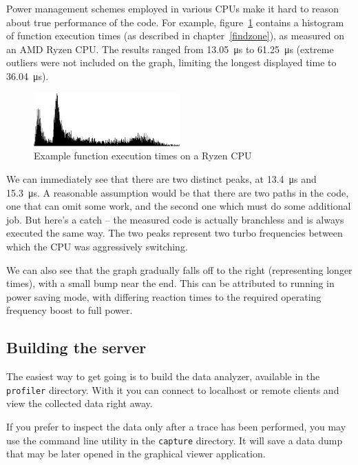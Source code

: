 \documentclass[hidelinks,titlepage,a4paper]{article}
\begin{document}
Power management schemes employed in various CPUs make it hard to reason about true performance of the code. For example, figure~\ref{ryzenimage} contains a histogram of function execution times (as described in chapter~\ref{findzone}), as measured on an AMD Ryzen CPU. The results ranged from 13.05~\si{\micro\second} to 61.25~\si{\micro\second} (extreme outliers were not included on the graph, limiting the longest displayed time to 36.04~\si{\micro\second}).

\begin{figure}[h]
\centering
\includegraphics[width=0.5\textwidth]{images/ryzen.png}
\caption{Example function execution times on a Ryzen CPU}
\label{ryzenimage}
\end{figure}

We can immediately see that there are two distinct peaks, at 13.4~\si{\micro\second} and 15.3~\si{\micro\second}. A reasonable assumption would be that there are two paths in the code, one that can omit some work, and the second one which must do some additional job. But here's a catch -- the measured code is actually branchless and is always executed the same way. The two peaks represent two turbo frequencies between which the CPU was aggressively switching.

We can also see that the graph gradually falls off to the right (representing longer times), with a small bump near the end. This can be attributed to running in power saving mode, with differing reaction times to the required operating frequency boost to full power.

\subsection{Building the server}
\label{buildingserver}

The easiest way to get going is to build the data analyzer, available in the \texttt{profiler} directory. With it you can connect to localhost or remote clients and view the collected data right away.

If you prefer to inspect the data only after a trace has been performed, you may use the command line utility in the \texttt{capture} directory. It will save a data dump that may be later opened in the graphical viewer application.
\end{document}

